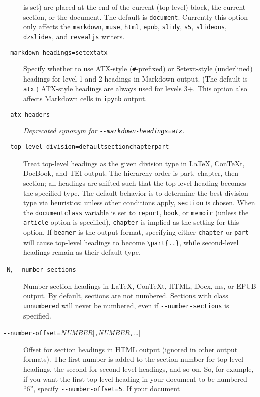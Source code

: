 \documentclass[
]{article}
\begin{document}
\begin{description}
is set) are placed at the end of the current (top-level) block, the
current section, or the document. The default is \texttt{document}.
Currently this option only affects the \texttt{markdown}, \texttt{muse},
\texttt{html}, \texttt{epub}, \texttt{slidy}, \texttt{s5},
\texttt{slideous}, \texttt{dzslides}, and \texttt{revealjs} writers.
\item[\texttt{-\/-markdown-headings=setext}\textbar{}\texttt{atx}]
Specify whether to use ATX-style (\texttt{\#}-prefixed) or Setext-style
(underlined) headings for level 1 and 2 headings in Markdown output.
(The default is \texttt{atx}.) ATX-style headings are always used for
levels 3+. This option also affects Markdown cells in \texttt{ipynb}
output.
\item[\texttt{-\/-atx-headers}]
\emph{Deprecated synonym for \texttt{-\/-markdown-headings=atx}.}
\item[\texttt{-\/-top-level-division=default}\textbar{}\texttt{section}\textbar{}\texttt{chapter}\textbar{}\texttt{part}]
Treat top-level headings as the given division type in LaTeX, ConTeXt,
DocBook, and TEI output. The hierarchy order is part, chapter, then
section; all headings are shifted such that the top-level heading
becomes the specified type. The default behavior is to determine the
best division type via heuristics: unless other conditions apply,
\texttt{section} is chosen. When the \texttt{documentclass} variable is
set to \texttt{report}, \texttt{book}, or \texttt{memoir} (unless the
\texttt{article} option is specified), \texttt{chapter} is implied as
the setting for this option. If \texttt{beamer} is the output format,
specifying either \texttt{chapter} or \texttt{part} will cause top-level
headings to become \texttt{\textbackslash{}part\{..\}}, while
second-level headings remain as their default type.
\item[\texttt{-N}, \texttt{-\/-number-sections}]
Number section headings in LaTeX, ConTeXt, HTML, Docx, ms, or EPUB
output. By default, sections are not numbered. Sections with class
\texttt{unnumbered} will never be numbered, even if
\texttt{-\/-number-sections} is specified.
\item[\texttt{-\/-number-offset=}\emph{NUMBER}{[}\texttt{,}\emph{NUMBER}\texttt{,}\emph{\ldots{}}{]}]
Offset for section headings in HTML output (ignored in other output
formats). The first number is added to the section number for top-level
headings, the second for second-level headings, and so on. So, for
example, if you want the first top-level heading in your document to be
numbered ``6'', specify \texttt{-\/-number-offset=5}. If your document

\end{description}
\end{document}
